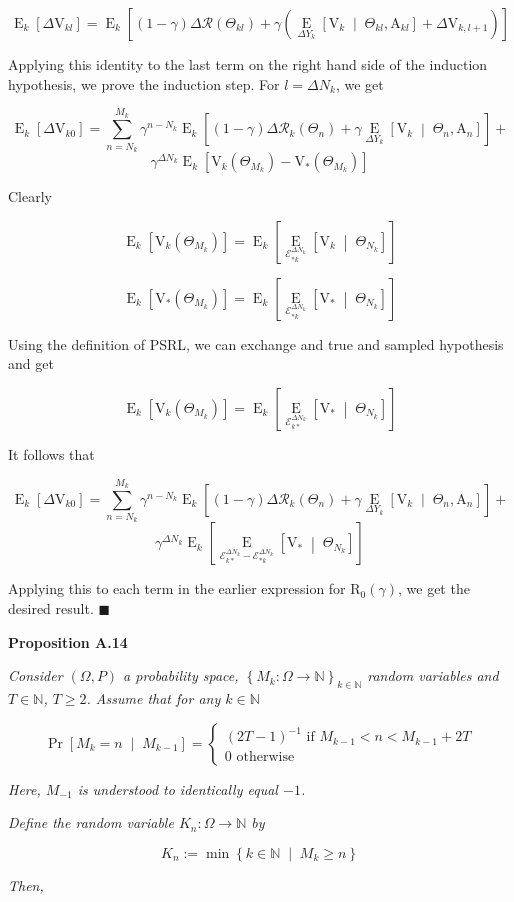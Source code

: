 \documentclass[a4paper]{article}
\newcommand{\Co}[1]{}
\newcommand{\AP}[1]{\left(#1\right)}
\newcommand{\AB}[1]{\left[#1\right]}
\newcommand{\AC}[1]{\left\{#1\right\}}
\newcommand{\ABM}[2]{\left[#1\;\middle\vert\;#2\right]}
\newcommand{\ACM}[2]{\left\{#1\;\middle\vert\;#2\right\}}
\newcommand{\CP}[3]{\underset{#1}{\operatorname{Pr}}\ABM{#2}{#3}}
\newcommand{\CE}[3]{\underset{#1}{\operatorname{E}}\ABM{#2}{#3}}
\newcommand{\Nats}{\mathbb{N}}
\newcommand{\R}{\mathcal{R}}
\newcommand{\V}{\mathrm{V}}
\newcommand{\Reg}{\mathrm{R}}
\newcommand{\SHy}{Y}
\newcommand{\AT}{\mathrm{A}}
\newcommand{\Ev}{\mathcal{E}}
\newcommand{\ET}{N}
\newcommand{\IT}{M}
\newcommand{\TE}[1]{{\operatorname{E}_k}\AB{#1}}
\begin{document}
$$\TE{\Delta\V_{kl}}=\TE{(1-\gamma)\Delta\R\AP{\Theta_{kl}}+\gamma\AP{\CE{\Delta\SHy_k}{\V_k}{\Theta_{kl},\AT_{kl}}+\Delta\V_{k,l+1}}}$$

Applying this identity to the last term on the right hand side of the induction hypothesis, we prove the induction step. For $l=\Delta\ET_k$, we get

$$\TE{\Delta\V_{k0}}=\sum_{n=\ET_k}^{\IT_k}\gamma^{n-\ET_k}\TE{(1-\gamma)\Delta\R_k\AP{\Theta_n}+\gamma\CE{\Delta\SHy_k}{\V_{k}}{\Theta_n,\AT_n}}+$$
$$\gamma^{\Delta\ET_k}\TE{\V_k\AP{\Theta_{\IT_k}}-\V_*\AP{\Theta_{\IT_k}}}$$

Clearly

$$\TE{\V_k\AP{\Theta_{\IT_k}}}=\TE{\CE{\Ev_{*k}^{\Delta\ET_k}}{\V_k}{\Theta_{\ET_k}}}$$

$$\TE{\V_*\AP{\Theta_{\IT_k}}}=\TE{\CE{\Ev_{*k}^{\Delta\ET_k}}{\V_*}{\Theta_{\ET_k}}}$$

Using the definition of PSRL, we can exchange and true and sampled hypothesis and get

$$\TE{\V_k\AP{\Theta_{\IT_k}}}=\TE{\CE{\Ev_{k*}^{\Delta\ET_k}}{\V_*}{\Theta_{\ET_k}}}$$

It follows that

$$\TE{\Delta\V_{k0}}=\sum_{n=\ET_k}^{\IT_k}\gamma^{n-\ET_k}\TE{(1-\gamma)\Delta\R_k\AP{\Theta_n}+\gamma\CE{\Delta\SHy_k}{\V_{k}}{\Theta_n,\AT_n}}+$$
$$\gamma^{\Delta\ET_k}\TE{\CE{\Ev_{k*}^{\Delta\ET_k}-\Ev_{*k}^{\Delta\ET_k}}{\V_*}{\Theta_{\ET_k}}}$$

Applying this to each term in the earlier expression for $\Reg_0(\gamma)$, we get the desired result. $\blacksquare$

\textbf{Proposition A.14}\Co{b}

\textit{Consider $(\Omega,P)$ a probability space, $\AC{M_k:\Omega\rightarrow\Nats}_{k\in\Nats}$ random variables and $T\in\Nats$, $T\geq2$. Assume that for any $k\in\Nats$}\Co{i}

$$\CP{}{M_{k}=n}{M_{k-1}}=\begin{cases} \AP{2T-1}^{-1} \text{ if } M_{k-1} < n < M_{k-1}+2T\\ 0 \text{ otherwise} \end{cases}$$

\textit{Here, $M_{-1}$ is understood to identically equal $-1$.}\Co{i}

\textit{Define the random variable $K_n:\Omega\rightarrow\Nats$ by}\Co{i}

$$K_n:=\min\ACM{k\in\Nats}{M_k\geq n}$$

\textit{Then,}\Co{i}
\end{document}
